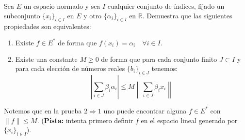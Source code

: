\begin{ejercicio}
    Sea $E$ un espacio normado y sea $I$ cualquier conjunto de índices, fijado un subconjunto $\{x_i\}_{i \in I}$ en $E$ y otro $\{\alpha_i\}_{i \in I}$ en $\mathbb{R}$. Demuestra que las siguientes propiedades son equivalentes:
    \begin{enumerate}
        \item Existe $f\in E^\ast$ de forma que $f(x_i) = \alpha_i\quad \forall i \in I$.
        \item Existe una constante $M\geq 0$ de forma que para cada conjunto finito $J\subset I$ y para cada elección de números reales $\{b_i\}_{i \in J}$ tenemos:
            \begin{equation*}
                \left|\sum_{i \in J}\beta_i \alpha_i\right| \leq M \left\|\sum_{i \in J} \beta_i x_i\right\|
            \end{equation*}
    \end{enumerate}
    Notemos que en la prueba $2\Longrightarrow 1$ uno puede encontrar alguna $f\in E^\ast$ con $\|f\| \leq M$. (\textbf{Pista:} intenta primero definir $f$ en el espacio lineal generado por $\{x_i\}_{i \in I}$).
\end{ejercicio}



